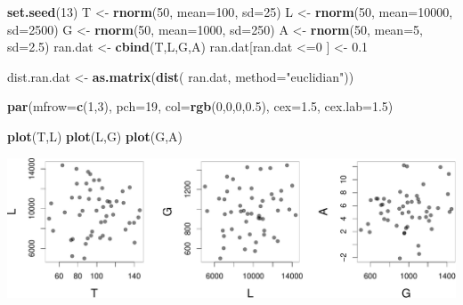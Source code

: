 \documentclass[twocolumn]{article}
\newenvironment{Shaded}{\begin{snugshade}}{\end{snugshade}}
\newcommand{\KeywordTok}[1]{\textcolor[rgb]{0.13,0.29,0.53}{\textbf{{#1}}}}
\newcommand{\DataTypeTok}[1]{\textcolor[rgb]{0.13,0.29,0.53}{{#1}}}
\newcommand{\DecValTok}[1]{\textcolor[rgb]{0.00,0.00,0.81}{{#1}}}
\newcommand{\FloatTok}[1]{\textcolor[rgb]{0.00,0.00,0.81}{{#1}}}
\newcommand{\StringTok}[1]{\textcolor[rgb]{0.31,0.60,0.02}{{#1}}}
\newcommand{\NormalTok}[1]{{#1}}
\begin{document}
\begin{Shaded}
\begin{Highlighting}[]
\KeywordTok{set.seed}\NormalTok{(}\DecValTok{13}\NormalTok{)}
\NormalTok{T <-}\StringTok{ }\KeywordTok{rnorm}\NormalTok{(}\DecValTok{50}\NormalTok{, }\DataTypeTok{mean=}\DecValTok{100}\NormalTok{, }\DataTypeTok{sd=}\DecValTok{25}\NormalTok{)}
\NormalTok{L <-}\StringTok{ }\KeywordTok{rnorm}\NormalTok{(}\DecValTok{50}\NormalTok{, }\DataTypeTok{mean=}\DecValTok{10000}\NormalTok{, }\DataTypeTok{sd=}\DecValTok{2500}\NormalTok{)}
\NormalTok{G <-}\StringTok{ }\KeywordTok{rnorm}\NormalTok{(}\DecValTok{50}\NormalTok{, }\DataTypeTok{mean=}\DecValTok{1000}\NormalTok{, }\DataTypeTok{sd=}\DecValTok{250}\NormalTok{)}
\NormalTok{A <-}\StringTok{ }\KeywordTok{rnorm}\NormalTok{(}\DecValTok{50}\NormalTok{, }\DataTypeTok{mean=}\DecValTok{5}\NormalTok{, }\DataTypeTok{sd=}\FloatTok{2.5}\NormalTok{)}
\NormalTok{ran.dat <-}\StringTok{ }\KeywordTok{cbind}\NormalTok{(T,L,G,A)}
\NormalTok{ran.dat[ran.dat <=}\DecValTok{0} \NormalTok{] <-}\StringTok{ }\FloatTok{0.1}

\NormalTok{dist.ran.dat <-}\StringTok{ }\KeywordTok{as.matrix}\NormalTok{(}\KeywordTok{dist}\NormalTok{(}
    \NormalTok{ran.dat, }\DataTypeTok{method=}\StringTok{"euclidian"}\NormalTok{))}

\KeywordTok{par}\NormalTok{(}\DataTypeTok{mfrow=}\KeywordTok{c}\NormalTok{(}\DecValTok{1}\NormalTok{,}\DecValTok{3}\NormalTok{), }\DataTypeTok{pch=}\DecValTok{19}\NormalTok{, }\DataTypeTok{col=}\KeywordTok{rgb}\NormalTok{(}\DecValTok{0}\NormalTok{,}\DecValTok{0}\NormalTok{,}\DecValTok{0}\NormalTok{,}\FloatTok{0.5}\NormalTok{),}
    \DataTypeTok{cex=}\FloatTok{1.5}\NormalTok{, }\DataTypeTok{cex.lab=}\FloatTok{1.5}\NormalTok{)}

\KeywordTok{plot}\NormalTok{(T,L)}
\KeywordTok{plot}\NormalTok{(L,G)}
\KeywordTok{plot}\NormalTok{(G,A)}
\end{Highlighting}
\end{Shaded}

\includegraphics{main_files/figure-latex/R_block_random-1.pdf}
\end{document}
